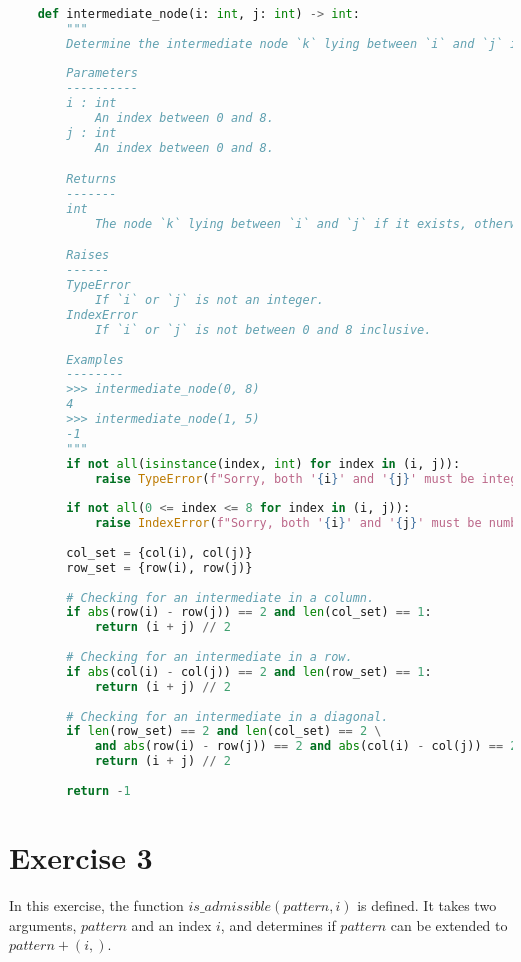 \documentclass[12pt]{article}
\theoremstyle{definition}
\begin{document}
\begin{lstlisting}[language=Python, caption=Exercise 2]
    
    def intermediate_node(i: int, j: int) -> int:
        """
        Determine the intermediate node `k` lying between `i` and `j` in a 3x3 grid, if it exists.
        
        Parameters
        ----------
        i : int 
            An index between 0 and 8.
        j : int 
            An index between 0 and 8.

        Returns
        -------
        int
            The node `k` lying between `i` and `j` if it exists, otherwise -1.

        Raises
        ------
        TypeError
            If `i` or `j` is not an integer.
        IndexError
            If `i` or `j` is not between 0 and 8 inclusive.
        
        Examples
        --------
        >>> intermediate_node(0, 8)
        4
        >>> intermediate_node(1, 5)
        -1
        """
        if not all(isinstance(index, int) for index in (i, j)):
            raise TypeError(f"Sorry, both '{i}' and '{j}' must be integers")
        
        if not all(0 <= index <= 8 for index in (i, j)):
            raise IndexError(f"Sorry, both '{i}' and '{j}' must be numbers between 0 and 8 inclusive.")
        
        col_set = {col(i), col(j)}
        row_set = {row(i), row(j)}
        
        # Checking for an intermediate in a column.
        if abs(row(i) - row(j)) == 2 and len(col_set) == 1:
            return (i + j) // 2
        
        # Checking for an intermediate in a row.
        if abs(col(i) - col(j)) == 2 and len(row_set) == 1:
            return (i + j) // 2
        
        # Checking for an intermediate in a diagonal.
        if len(row_set) == 2 and len(col_set) == 2 \
            and abs(row(i) - row(j)) == 2 and abs(col(i) - col(j)) == 2:
            return (i + j) // 2
        
        return -1

\end{lstlisting}

\section*{Exercise 3}
In this exercise, the function $is\_admissible(pattern, i)$ is defined. It takes two arguments, $pattern$ and an index $i$, and determines if $pattern$ can be extended to $pattern + (i,)$.
\end{document}

